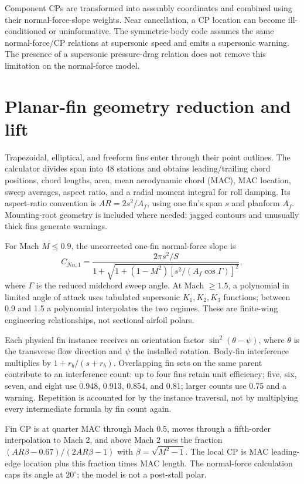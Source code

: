 Component CPs are transformed into assembly coordinates and combined using their normal-force-slope weights. Near cancellation, a CP location can become ill-conditioned or uninformative. The symmetric-body code assumes the same normal-force/CP relations at supersonic speed and emits a supersonic warning. The presence of a supersonic pressure-drag relation does not remove this limitation on the normal-force model.

\section{Planar-fin geometry reduction and lift}
Trapezoidal, elliptical, and freeform fins enter  through their point outlines. The calculator divides span into 48 stations and obtains leading/trailing chord positions, chord lengths, area, mean aerodynamic chord (MAC), MAC location, sweep averages, aspect ratio, and a radial moment integral for roll damping. Its aspect-ratio convention is $AR=2s^2/A_f$, using one fin's span $s$ and planform $A_f$. Mounting-root geometry is included where needed; jagged contours and unusually thick fins generate warnings.

For Mach $M\leq0.9$, the uncorrected one-fin normal-force slope is
\begin{equation}
C_{N\alpha,1}=\frac{2\pi s^2/S}{1+\sqrt{1+(1-M^2)[s^2/(A_f\cos\Gamma)]^2}},
\end{equation}
where $\Gamma$ is the reduced midchord sweep angle. At Mach $\geq1.5$, a polynomial in limited angle of attack uses tabulated supersonic $K_1,K_2,K_3$ functions; between 0.9 and 1.5 a polynomial interpolates the two regimes. These are finite-wing engineering relationships, not sectional airfoil polars.

Each physical fin instance receives an orientation factor $\sin^2(\theta-\psi)$, where $\theta$ is the transverse flow direction and $\psi$ the installed rotation. Body-fin interference multiplies by $1+r_b/(s+r_b)$. Overlapping fin sets on the same parent contribute to an interference count: up to four fins retain unit efficiency; five, six, seven, and eight use 0.948, 0.913, 0.854, and 0.81; larger counts use 0.75 and a warning. Repetition is accounted for by the instance traversal, not by multiplying every intermediate formula by fin count again.

Fin CP is at quarter MAC through Mach 0.5, moves through a fifth-order interpolation to Mach 2, and above Mach 2 uses the fraction $(AR\beta-0.67)/(2AR\beta-1)$ with $\beta=\sqrt{M^2-1}$. The local CP is MAC leading-edge location plus this fraction times MAC length. The normal-force calculation caps its angle at $20^\circ$; the model is not a post-stall polar.

